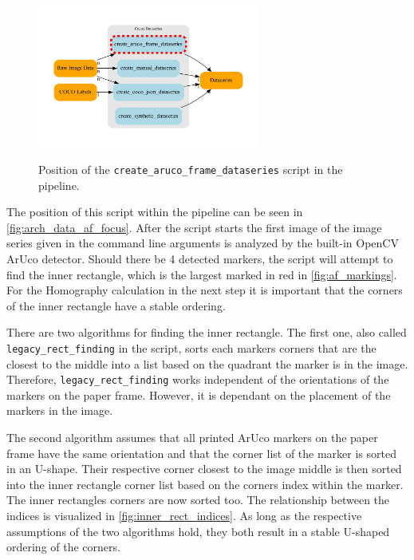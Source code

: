 \documentclass[10pt]{book}
\newcommand{\figureref}[1]{\autoref{#1}}
\begin{document}
\begin{figure}
  \caption{Position of the \texttt{create\_aruco\_frame\_dataseries} script in the pipeline.}
  \includegraphics[width=0.65\textwidth]{graph/arch_data_af_focus}
  \label{fig:arch_data_af_focus}
\end{figure}

The position of this script within the pipeline can be seen in \figureref{fig:arch_data_af_focus}. After the script starts the first image of the image series given in the command line arguments is analyzed by the built-in \ac{OpenCV} \ac{ArUco} detector. Should there be 4 detected markers, the script will attempt to find the inner rectangle, which is the largest marked in red in \figureref{fig:af_markings}. For the Homography calculation in the next step it is important that the corners of the inner rectangle have a stable ordering. 

There are two algorithms for finding the inner rectangle. The first one, also called \texttt{legacy\_rect\_finding} in the script, sorts each markers corners that are the closest to the middle into a list based on the quadrant the marker is in the image. Therefore, \texttt{legacy\_rect\_finding} works independent of the orientations of the markers on the paper frame. However, it is dependant on the placement of the markers in the image. 

The second algorithm assumes that all printed \ac{ArUco} markers on the paper frame have the same orientation and that the corner list of the marker is sorted in an U-shape. Their respective corner closest to the image middle is then sorted into the inner rectangle corner list based on the corners index within the marker. %
The inner rectangles corners are now sorted too. The relationship between the indices is visualized in \figureref{fig:inner_rect_indices}. As long as the respective assumptions of the two algorithms hold, they both result in a stable U-shaped ordering of the corners.
\end{document}
